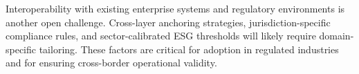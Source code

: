 \documentclass[oneside,10pt]{swissi}
\begin{document}
Interoperability with existing enterprise systems and regulatory environments is another open challenge. Cross-layer anchoring strategies, jurisdiction-specific compliance rules, and sector-calibrated ESG thresholds will likely require domain-specific tailoring. These factors are critical for adoption in regulated industries and for ensuring cross-border operational validity.

\bigskip

\bigskip

\printbibliography

\swDeclarationsPage
\end{document}
